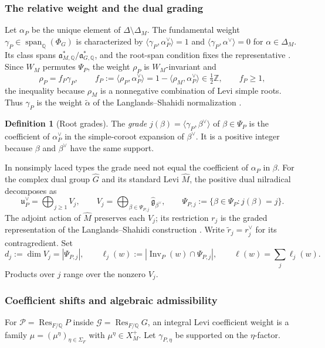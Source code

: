 \documentclass[12pt]{amsart}
\numberwithin{equation}{section}
\theoremstyle{plain}
\theoremstyle{definition}
\newtheorem{definition}[theorem]{Definition}
\theoremstyle{remark}
\DeclareMathOperator{\Inv}{Inv}
\begin{document}
\subsubsection{The relative weight and the dual grading}
Let $\alpha_P$ be the unique element of $\Delta\setminus\Delta_M$. The fundamental weight $\gamma_P\in\operatorname{span}_{\mathbb Q}(\Phi_G)$ is characterized by $\langle\gamma_P,\alpha_P^\vee\rangle=1$ and $\langle\gamma_P,\alpha^\vee\rangle=0$ for $\alpha\in\Delta_M$. Its class spans $\mathfrak a_{M,\mathbb Q}^*/\mathfrak a_{G,\mathbb Q}^*$, and the root-span condition fixes the representative
\cite[\S9.1.3]{HarderChapterNine}. Since $W_M$ permutes $\Psi_P$, the weight $\rho_P$ is $W_M$-invariant and 
\begin{equation}\label{eq:relative-weight}
 \rho_P=f_P\gamma_P,
 \qquad
 f_P:=\langle\rho_P,\alpha_P^\vee\rangle
     =1-\langle\rho_M,\alpha_P^\vee\rangle
     \in\tfrac12\mathbb Z,
 \qquad f_P\ge1,
\end{equation}
the inequality because $\rho_M$ is a nonnegative combination of Levi simple roots. Thus $\gamma_P$ is the weight $\widetilde\alpha$ of the Langlands--Shahidi normalization \cite{Shahidi2010}.

\begin{definition}[Root grades]\label{def:root-grades}
The \emph{grade} $j(\beta)=\langle\gamma_P,\beta^\vee\rangle$ of $\beta\in\Psi_P$ is the coefficient of $\alpha_P^\vee$ in the simple-coroot expansion of $\beta^\vee$. It is a positive integer because $\beta$ and $\beta^\vee$ have the same support.

\end{definition}

In nonsimply laced types the grade need not equal the coefficient of $\alpha_P$ in $\beta$. For the complex dual group $\widehat G$ and its standard Levi $\widehat M$, the positive dual nilradical decomposes as 
\[
 \mathfrak u_P^\vee=\bigoplus_{j\ge1}V_j,
 \qquad
 V_j=\bigoplus_{\beta\in\Psi_{P,j}}\widehat{\mathfrak g}_{\beta^\vee},
 \qquad
 \Psi_{P,j}:=\{\beta\in\Psi_P:j(\beta)=j\}.
\]
The adjoint action of $\widehat M$ preserves each $V_j$; its restriction $r_j$ is the graded representation of the Langlands--Shahidi construction \cite{Shahidi2010}. Write $\widetilde r_j=r_j^\vee$ for its contragredient. Set 
\[
 d_j:=\dim V_j=|\Psi_{P,j}|,
 \qquad
 \ell_j(w):=|\Inv_P(w)\cap\Psi_{P,j}|,
 \qquad
 \ell(w)=\sum_j\ell_j(w).
\]
Products over $j$ range over the nonzero $V_j$.

\subsubsection{Coefficient shifts and algebraic admissibility}
For $\mathcal P=\operatorname{Res}_{F/\mathbb Q}P$ inside $\mathcal G=\operatorname{Res}_{F/\mathbb Q}G$, an integral Levi coefficient weight is a family $\mu=(\mu^\eta)_{\eta\in\Sigma_F}$ with $\mu^\eta\in X_M^+$. Let $\gamma_{P,\eta}$ be supported on the $\eta$-factor.
\end{document}
